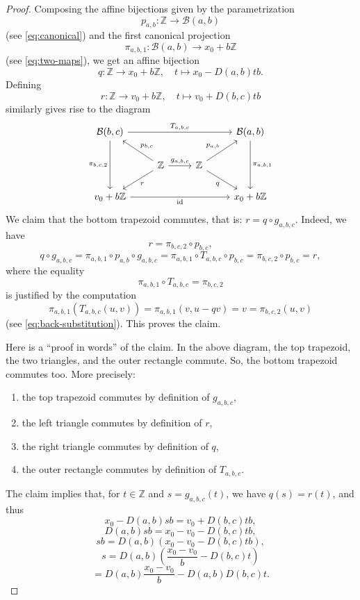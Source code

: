 \documentclass[12pt,letterpaper]{article}
\numberwithin{equation}{section}
\newcommand{\Z}{\mathbb Z}
\newcommand{\B}{\mathcal B}
\newcommand{\id}{\operatorname{id}}
\theoremstyle{plain}
\theoremstyle{definition}
\begin{document}
\begin{proof}
Composing the affine bijections given by the parametrization
\[
 p_{a,b}:\Z\to\B(a,b)
\]
(see \eqref{eq:canonical}) and the first canonical projection
\[
 \pi_{a,b,1}:\B(a,b)\to x_0+b\Z
\]
(see \eqref{eq:two-maps}), we get an affine bijection
\[
 q:\Z\to x_0+b\Z,\quad t\mapsto x_0-D(a,b)tb.
\]
Defining  
\[
 r:\Z\to v_0+b\Z,\quad t\mapsto v_0+D(b,c)tb
\]
similarly gives rise to the diagram 
\[
\begin{tikzcd}
\B(b,c)\arrow[rrr,"T_{a,b,c}"]\arrow[dd,"\pi_{b,c,2}"'] & & & \B(a,b)\arrow[dd,"\pi_{a,b,1}"] \\
 & \Z\arrow[ul,"p_{b,c}"']\arrow[r,"g_{a,b,c}"]\arrow[dl,"r"] & \Z\arrow[ur,"p_{a,b}"]\arrow[dr,"q"'] & \\
v_0+b\Z\arrow[rrr,"\id"'] & & & x_0+b\Z
\end{tikzcd}
\]
We claim that the bottom trapezoid commutes, that is: $r=q\circ g_{a,b,c}$. Indeed, we have 
\[
 r=\pi_{b,c,2}\circ p_{b,c},
\]
\[
 q\circ g_{a,b,c}=\pi_{a,b,1}\circ p_{a,b}\circ g_{a,b,c}=\pi_{a,b,1}\circ T_{a,b,c}\circ p_{b,c}=\pi_{b,c,2}\circ p_{b,c}=r,
\]
where the equality
\[
 \pi_{a,b,1}\circ T_{a,b,c}=\pi_{b,c,2}
\]
is justified by the computation
\[
 \pi_{a,b,1}(T_{a,b,c}(u,v))=\pi_{a,b,1}(v,u-qv)=v=\pi_{b,c,2}(u,v)
\]
(see \eqref{eq:back-substitution}). This proves the claim. 

Here is a ``proof in words'' of the claim. In the above diagram, the top trapezoid, the two triangles, and the outer rectangle commute. So, the bottom trapezoid commutes too. More precisely:
\begin{enumerate}
  \item the top trapezoid commutes by definition of $g_{a,b,c}$,
  \item the left triangle commutes by definition of $r$,
  \item the right triangle commutes by definition of $q$,
  \item the outer rectangle commutes by definition of $T_{a,b,c}$.
\end{enumerate}

The claim implies that, for $t\in\Z$ and $s=g_{a,b,c}(t)$, we have $q(s)=r(t)$, and thus
\[
 x_0-D(a,b)sb=v_0+D(b,c)tb,
\]
\[
 D(a,b)sb=x_0-v_0-D(b,c)tb,
\]
\[
 sb=D(a,b)(x_0-v_0-D(b,c)tb),
\]
\[
 s=D(a,b)\left(\frac{x_0-v_0}{b}-D(b,c)t\right)
\]
\[
 =D(a,b)\frac{x_0-v_0}{b}-D(a,b)D(b,c)t.
\]
\end{proof}
\end{document}
